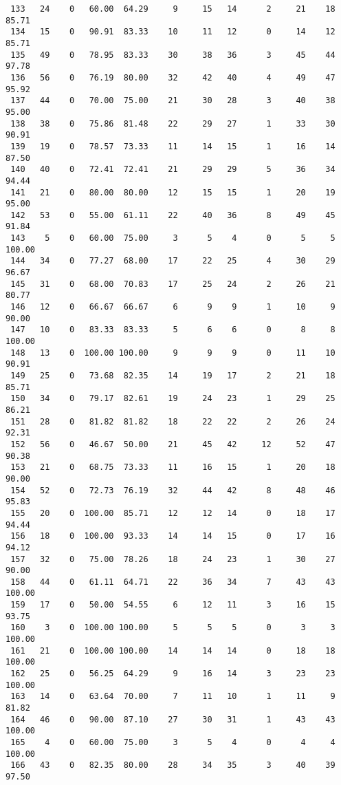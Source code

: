 \begin{verbatim}
 133   24    0   60.00  64.29     9     15   14      2     21    18    85.71
 134   15    0   90.91  83.33    10     11   12      0     14    12    85.71
 135   49    0   78.95  83.33    30     38   36      3     45    44    97.78
 136   56    0   76.19  80.00    32     42   40      4     49    47    95.92
 137   44    0   70.00  75.00    21     30   28      3     40    38    95.00
 138   38    0   75.86  81.48    22     29   27      1     33    30    90.91
 139   19    0   78.57  73.33    11     14   15      1     16    14    87.50
 140   40    0   72.41  72.41    21     29   29      5     36    34    94.44
 141   21    0   80.00  80.00    12     15   15      1     20    19    95.00
 142   53    0   55.00  61.11    22     40   36      8     49    45    91.84
 143    5    0   60.00  75.00     3      5    4      0      5     5   100.00
 144   34    0   77.27  68.00    17     22   25      4     30    29    96.67
 145   31    0   68.00  70.83    17     25   24      2     26    21    80.77
 146   12    0   66.67  66.67     6      9    9      1     10     9    90.00
 147   10    0   83.33  83.33     5      6    6      0      8     8   100.00
 148   13    0  100.00 100.00     9      9    9      0     11    10    90.91
 149   25    0   73.68  82.35    14     19   17      2     21    18    85.71
 150   34    0   79.17  82.61    19     24   23      1     29    25    86.21
 151   28    0   81.82  81.82    18     22   22      2     26    24    92.31
 152   56    0   46.67  50.00    21     45   42     12     52    47    90.38
 153   21    0   68.75  73.33    11     16   15      1     20    18    90.00
 154   52    0   72.73  76.19    32     44   42      8     48    46    95.83
 155   20    0  100.00  85.71    12     12   14      0     18    17    94.44
 156   18    0  100.00  93.33    14     14   15      0     17    16    94.12
 157   32    0   75.00  78.26    18     24   23      1     30    27    90.00
 158   44    0   61.11  64.71    22     36   34      7     43    43   100.00
 159   17    0   50.00  54.55     6     12   11      3     16    15    93.75
 160    3    0  100.00 100.00     5      5    5      0      3     3   100.00
 161   21    0  100.00 100.00    14     14   14      0     18    18   100.00
 162   25    0   56.25  64.29     9     16   14      3     23    23   100.00
 163   14    0   63.64  70.00     7     11   10      1     11     9    81.82
 164   46    0   90.00  87.10    27     30   31      1     43    43   100.00
 165    4    0   60.00  75.00     3      5    4      0      4     4   100.00
 166   43    0   82.35  80.00    28     34   35      3     40    39    97.50

\end{verbatim}
